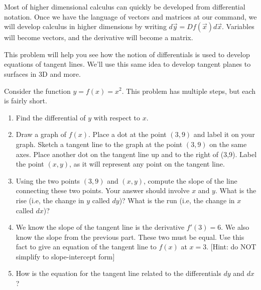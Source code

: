 Most of higher dimensional calculus can quickly be developed from differential notation. Once we have the language of vectors and matrices at our command, we will develop calculus in higher dimensions by writing $d\vec y = Df(\vec x) d\vec x$.  Variables will become vectors, and the derivative will become a matrix.
 
This problem will help you see how the notion of differentials is used to develop equations of tangent lines. We'll use this same idea to develop tangent planes to surfaces in 3D and more.
\begin{problem} \label{differentialtangentline}
Consider the function $y=f(x) = x^2$. This problem has multiple steps, but each is fairly short.
\begin{enumerate}
\item Find the differential of $y$ with respect to $x$.  
\item Draw a graph of $f(x)$. Place a dot at the point $(3,9)$ and label it on your graph. Sketch a tangent line to the graph at the point $(3,9)$ on the same axes. Place another dot on the tangent line up and to the right of (3,9). Label the point $(x,y)$, as it will represent any point on the tangent line. 
\item Using the two points $(3,9)$ and $(x,y)$, compute the slope of the line connecting these two points. Your answer should involve $x$ and $y$. What is the rise (i.e, the change in $y$ called $dy$)? What is the run (i.e, the change in $x$ called $dx$)?  
\item We know the slope of the tangent line is the derivative $f'(3)=6$. We also know the slope from the previous part. These two must be equal. Use this fact to give an equation of the tangent line to $f(x)$ at $x=3$. [Hint: do NOT simplify to slope-intercept form]
\item How is the equation for the tangent line related to the differentials $dy$ and $dx$?
\end{enumerate}
\end{problem}
 
